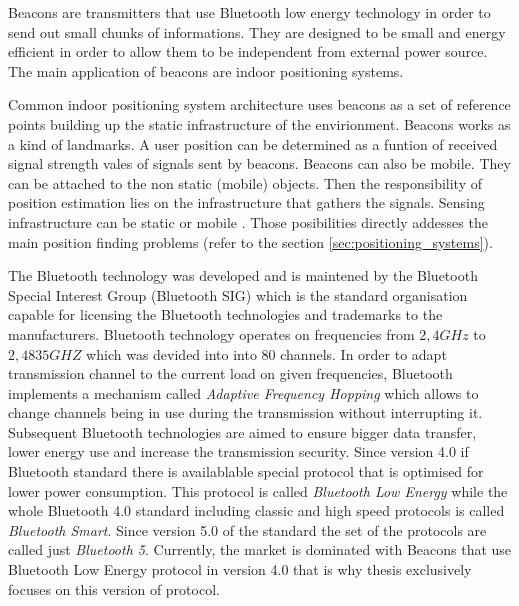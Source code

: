\documentclass[../main.tex]{subfiles}
\begin{document}
Beacons are transmitters that use Bluetooth low energy technology in order to send out small chunks of informations. They are designed to be small and energy efficient in order to allow them to be independent from external power source. The main application of beacons are indoor positioning systems.

Common indoor positioning system architecture uses beacons as a set of reference points building up the static infrastructure of the envirionment. Beacons works as a kind of landmarks. A user position can be determined as a funtion of received signal strength vales of signals sent by beacons. Beacons can also be mobile. They can be attached to the non static (mobile) objects. Then the responsibility of position estimation lies on the infrastructure that gathers the signals. Sensing infrastructure can be static or mobile \cite{discover_beacons_and_position}. Those posibilities directly addesses the main position finding problems (refer to the section \ref{sec:positioning_systems}).

The Bluetooth technology was developed and is maintened by the Bluetooth Special Interest Group (Bluetooth SIG) which is the standard organisation capable for licensing the Bluetooth technologies and trademarks to the manufacturers. Bluetooth technology operates on frequencies from $2,4GHz$ to $2,4835GHZ$ which was devided into into 80 channels. In order to adapt transmission channel to the current load on given frequencies, Bluetooth implements a mechanism called \textit{Adaptive Frequency Hopping} which allows to change channels being in use during the transmission without interrupting it. Subsequent Bluetooth technologies are aimed to ensure bigger data transfer, lower energy use and increase the transmission security. Since version 4.0 if Bluetooth standard there is availablable special protocol that is optimised for lower power consumption. This protocol is called \textit{Bluetooth Low Energy} while the whole Bluetooth 4.0 standard including classic and high speed protocols is called \textit{Bluetooth Smart}. Since version 5.0 of the standard the set of the protocols are called just \textit{Bluetooth 5}. Currently, the market is dominated with Beacons that use Bluetooth Low Energy protocol in version 4.0 that is why thesis exclusively focuses on this version of protocol.
\end{document}
